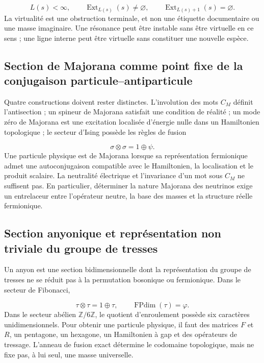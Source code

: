 \[
L(s)<\infty,
\qquad
\operatorname{Ext}_{L(s)}(s)\ne\varnothing,
\qquad
\operatorname{Ext}_{L(s)+1}(s)=\varnothing.
\]
La virtualité est une obstruction terminale, et non une étiquette documentaire ou une masse imaginaire. Une résonance peut être instable sans être virtuelle en ce sens ; une ligne interne peut être virtuelle sans constituer une nouvelle espèce.

\subsection{Section de Majorana comme point fixe de la conjugaison particule–antiparticule}
Quatre constructions doivent rester distinctes. L'involution des mots \(C_M\) définit l'antisection ; un spineur de Majorana satisfait une condition de réalité ; un mode zéro de Majorana est une excitation localisée d'énergie nulle dans un Hamiltonien topologique ; le secteur d'Ising possède les règles de fusion

\[
\sigma\otimes\sigma=1\oplus\psi.
\]
Une particule physique est de Majorana lorsque sa représentation fermionique admet une autoconjugaison compatible avec le Hamiltonien, la localisation et le produit scalaire. La neutralité électrique et l'invariance d'un mot sous \(C_M\) ne suffisent pas. En particulier, déterminer la nature Majorana des neutrinos exige un entrelaceur entre l'opérateur neutre, la base des masses et la structure réelle fermionique.

\subsection{Section anyonique et représentation non triviale du groupe de tresses}
Un anyon est une section bidimensionnelle dont la représentation du groupe de tresses ne se réduit pas à la permutation bosonique ou fermionique. Dans le secteur de Fibonacci,

\[
\tau\otimes\tau=1\oplus\tau,
\qquad
\operatorname{FPdim}(\tau)=\varphi.
\]
Dans le secteur abélien \(\mathbb Z/6\mathbb Z\), le quotient d'enroulement possède six caractères unidimensionnels. Pour obtenir une particule physique, il faut des matrices \(F\) et \(R\), un pentagone, un hexagone, un Hamiltonien à gap et des opérateurs de tressage. L'anneau de fusion exact détermine le codomaine topologique, mais ne fixe pas, à lui seul, une masse universelle.

